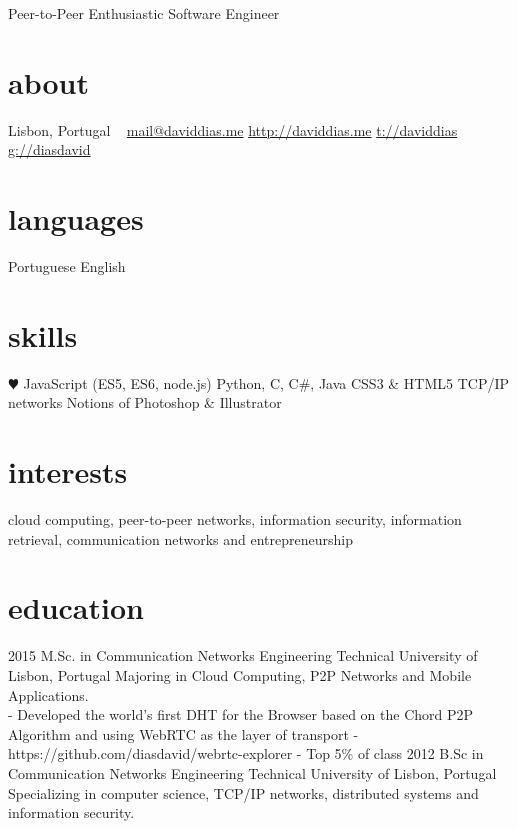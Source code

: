 \documentclass[]{friggeri-cv}
\begin{document}
       {Peer-to-Peer Enthusiastic Software Engineer}

\begin{aside}
  \section{about}
    Lisbon, Portugal
    ~
    \href{mailto:mail@daviddias.me}{mail@daviddias.me}
    \href{http://daviddias.me}{http://daviddias.me}
    \href{https://twitter.com/daviddias}{t://daviddias}
    \href{https://github.com/diasdavid}{g://diasdavid}
  \section{languages}
    Portuguese
    English
  \section{skills}
    {\color{red} $\varheartsuit$} JavaScript
    (ES5, ES6, node.js)
    Python, C, C\#, Java
    CSS3 \& HTML5
    TCP/IP networks
    Notions of Photoshop \& Illustrator
\end{aside}

\section{interests}

cloud computing, peer-to-peer networks, information security, information retrieval, communication networks and entrepreneurship

\section{education}

\begin{entrylist}
  \entry
    {2015}
    {M.Sc. in Communication Networks Engineering}
    {Technical University of Lisbon, Portugal}
    {Majoring in Cloud Computing, P2P Networks and Mobile Applications. \\
        - Developed the world's first DHT for the Browser based on the Chord P2P Algorithm and using WebRTC as the layer of transport - https://github.com/diasdavid/webrtc-explorer
        - Top 5\% of class}
  \entry
    {2012}
    {B.Sc in Communication Networks Engineering}
    {Technical University of Lisbon, Portugal}
    {Specializing in computer science, TCP/IP networks, distributed systems and information security.}
\end{entrylist}
\end{document}
